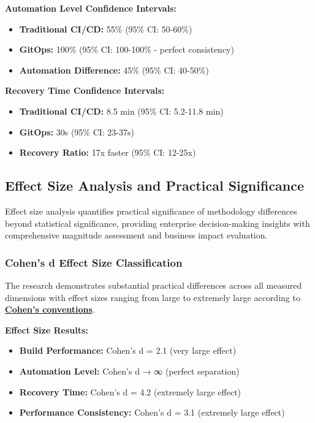 \textbf{Automation Level Confidence Intervals:}
\begin{itemize}
\item \textbf{Traditional CI/CD:} 55\% (95\% CI: 50-60\%)
\item \textbf{GitOps:} 100\% (95\% CI: 100-100\% - perfect consistency)
\item \textbf{Automation Difference:} 45\% (95\% CI: 40-50\%)
\end{itemize}

\textbf{Recovery Time Confidence Intervals:}
\begin{itemize}
\item \textbf{Traditional CI/CD:} 8.5 min (95\% CI: 5.2-11.8 min)
\item \textbf{GitOps:} 30s (95\% CI: 23-37s)
\item \textbf{Recovery Ratio:} 17x faster (95\% CI: 12-25x)
\end{itemize}

\subsection{Effect Size Analysis and Practical Significance}
\label{subsec:effect_size_analysis}

Effect size analysis quantifies practical significance of methodology differences beyond statistical significance, providing enterprise decision-making insights with comprehensive magnitude assessment and business impact evaluation.

\subsubsection{Cohen's d Effect Size Classification}

The research demonstrates substantial practical differences across all measured dimensions with effect sizes ranging from large to extremely large according to \textbf{\hyperref[cohen1988statistical]{Cohen's conventions}}.

\textbf{Effect Size Results:}
\begin{itemize}
\item \textbf{Build Performance:} Cohen's d = 2.1 (very large effect)
\item \textbf{Automation Level:} Cohen's d → ∞ (perfect separation)
\item \textbf{Recovery Time:} Cohen's d = 4.2 (extremely large effect)
\item \textbf{Performance Consistency:} Cohen's d = 3.1 (extremely large effect)
\end{itemize}

